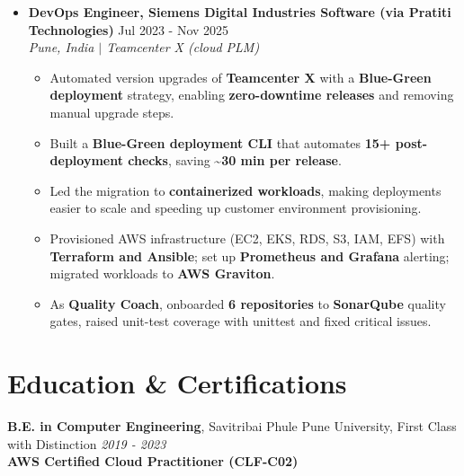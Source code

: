 \documentclass[letterpaper,11pt]{article}
\newcommand{\resumeItem}[1]{
  \item\small{#1}
}
\newcommand{\resumeSubheading}[4]{
  \item
  \textbf{#1} \hfill #2 \\
  \textit{\small #3} \hfill \textit{\small #4}
  \vspace{-5pt}
}
\newcommand{\resumeItemListStart}{
  \begin{itemize}[
    leftmargin=0.22in,
    label=\raisebox{0.25ex}{\scriptsize$\bullet$},
    itemsep=0.5pt,
    topsep=1pt,
    parsep=0pt
  ]
}
\newcommand{\resumeItemListEnd}{
  \end{itemize}\vspace{-2pt}
}
\begin{document}
\begin{itemize}[leftmargin=0.15in, label={}]
\resumeSubheading
    {DevOps Engineer, Siemens Digital Industries Software (via Pratiti Technologies)}{Jul 2023 - Nov 2025}
    {Pune, India $|$ Teamcenter X (cloud PLM)}{}
\resumeItemListStart
    \resumeItem{Automated version upgrades of \textbf{Teamcenter X} with a \textbf{Blue-Green deployment} strategy, enabling \textbf{zero-downtime releases} and removing manual upgrade steps.}
    \resumeItem{Built a \textbf{Blue-Green deployment CLI} that automates \textbf{15+ post-deployment checks}, saving \textbf{\textasciitilde30 min per release}.}
    \resumeItem{Led the migration to \textbf{containerized workloads}, making deployments easier to scale and speeding up customer environment provisioning.}
    \resumeItem{Provisioned AWS infrastructure (EC2, EKS, RDS, S3, IAM, EFS) with \textbf{Terraform and Ansible}; set up \textbf{Prometheus and Grafana} alerting; migrated workloads to \textbf{AWS Graviton}.}
    \resumeItem{As \textbf{Quality Coach}, onboarded \textbf{6 repositories} to \textbf{SonarQube} quality gates, raised unit-test coverage with unittest and fixed critical issues.}
\resumeItemListEnd

\end{itemize}

\section{Education \& Certifications}
\begin{itemize}[leftmargin=0.15in, label={}]
\small{\item{
    \textbf{B.E. in Computer Engineering}, Savitribai Phule Pune University, First Class with Distinction \hfill \textit{2019 - 2023} \\
    \textbf{AWS Certified Cloud Practitioner (CLF-C02)}
}}
\end{itemize}
\end{document}
